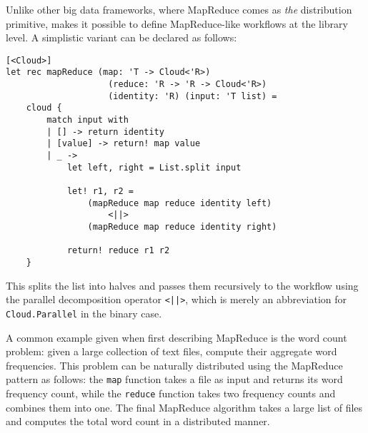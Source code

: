 Unlike other big data frameworks, where MapReduce comes as \emph{the} distribution primitive,
\mbrace{} makes it possible to define MapReduce-like workflows at the library level. 
A simplistic variant can be declared as follows:
\begin{lstlisting}
[<Cloud>]
let rec mapReduce (map: 'T -> Cloud<'R>) 
				    (reduce: 'R -> 'R -> Cloud<'R>) 
                    (identity: 'R) (input: 'T list) =
    cloud {
        match input with
        | [] -> return identity
        | [value] -> return! map value
        | _ ->
            let left, right = List.split input
 
            let! r1, r2 =
            	(mapReduce map reduce identity left)
            		<||>
	            (mapReduce map reduce identity right)
 
            return! reduce r1 r2
    }
\end{lstlisting}
This splits the list into halves and passes them 
recursively to the workflow using the parallel decomposition operator \texttt{<||>},
which is merely an abbreviation for \texttt{Cloud.Parallel} in the binary case.

A common example given when first describing MapReduce is the word count problem:
given a large collection of text files, compute their aggregate word frequencies.
This problem can be naturally distributed using the MapReduce pattern as follows:
the \texttt{map} function takes a file as input and returns its word frequency
count, while the \texttt{reduce} function takes two frequency counts and combines 
them into one.
The final MapReduce algorithm takes a large list of files and computes the total word
count in a distributed manner.

